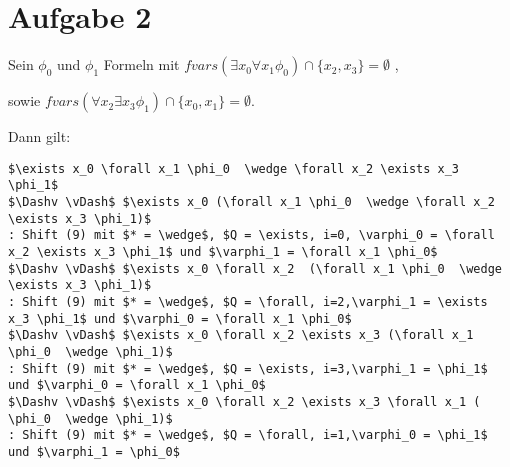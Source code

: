 \section*{Aufgabe 2}

Sein $\phi_0$ und $\phi_1$ Formeln mit $fvars(\exists x_0 \forall x_1 \phi_0) \cap \{x_2,x_3\} = \emptyset$ ,

sowie $fvars(\forall x_2 \exists x_3 \phi_1) \cap \{x_0, x_1 \} = \emptyset.$

Dann gilt:
\begin{lstlisting}
$\exists x_0 \forall x_1 \phi_0  \wedge \forall x_2 \exists x_3 \phi_1$
$\Dashv \vDash$	$\exists x_0 (\forall x_1 \phi_0  \wedge \forall x_2 \exists x_3 \phi_1)$ 
: Shift (9) mit $* = \wedge$, $Q = \exists, i=0, \varphi_0 = \forall x_2 \exists x_3 \phi_1$ und $\varphi_1 = \forall x_1 \phi_0$
$\Dashv \vDash$	$\exists x_0 \forall x_2  (\forall x_1 \phi_0  \wedge \exists x_3 \phi_1)$ 
: Shift (9) mit $* = \wedge$, $Q = \forall, i=2,\varphi_1 = \exists x_3 \phi_1$ und $\varphi_0 = \forall x_1 \phi_0$
$\Dashv \vDash$	$\exists x_0 \forall x_2 \exists x_3 (\forall x_1 \phi_0  \wedge \phi_1)$ 
: Shift (9) mit $* = \wedge$, $Q = \exists, i=3,\varphi_1 = \phi_1$ und $\varphi_0 = \forall x_1 \phi_0$
$\Dashv \vDash$	$\exists x_0 \forall x_2 \exists x_3 \forall x_1 ( \phi_0  \wedge \phi_1)$ 
: Shift (9) mit $* = \wedge$, $Q = \forall, i=1,\varphi_0 = \phi_1$ und $\varphi_1 = \phi_0$
\end{lstlisting}

